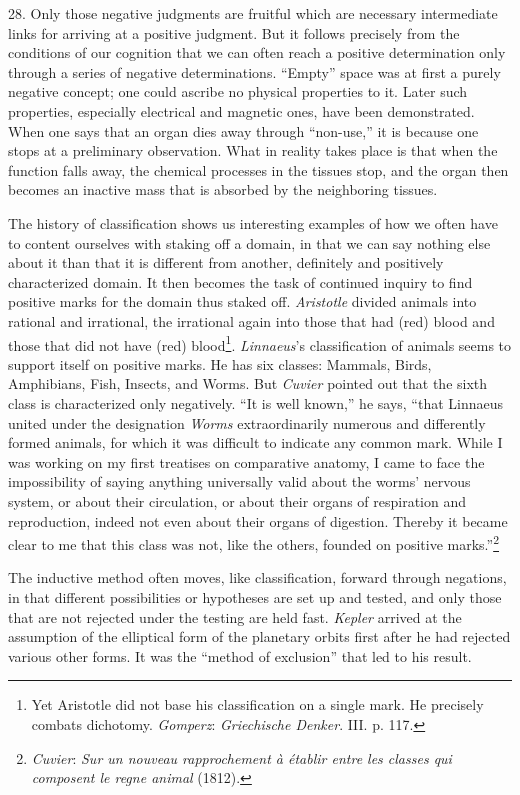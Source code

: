 \documentclass[12pt,a4paper]{book}
\newcommand{\opage}[1]{\marginnote{\footnotesize\textit{[#1]}}}
\begin{document}
28. Only those negative judgments are fruitful which are necessary
intermediate links for arriving at a positive judgment. But it follows
precisely from the conditions of our cognition that we can often reach a
positive determination only through a series of negative determinations.
``Empty'' space was at first a purely negative concept; one could ascribe
no physical properties to it. Later such properties, especially electrical
and magnetic ones, have been demonstrated. When one says that an organ
dies away through ``non-use,'' it is because one stops at a preliminary
observation. What in reality takes place is that when the function falls
away, the chemical processes in the tissues stop, and the organ then
becomes an inactive mass that is absorbed by the neighboring tissues.

The history of classification shows us interesting examples of how we
often have to content ourselves with staking off a domain, in that we can
say nothing else about it than that it is different from another,
definitely and positively characterized \opage{81}domain. It then becomes the task
of continued inquiry to find positive marks for the domain thus staked
off. \emph{Aristotle} divided animals into rational and irrational, the
irrational again into those that had (red) blood and those that did not
have (red) blood\footnote{Yet Aristotle did not base his classification on
a single mark. He precisely combats dichotomy. \emph{Gomperz}:
\emph{Griechische Denker}. III. p. 117.}. \emph{Linnaeus}'s classification
of animals seems to support itself on positive marks. He has six classes:
Mammals, Birds, Amphibians, Fish, Insects, and Worms. But \emph{Cuvier}
pointed out that the sixth class is characterized only negatively. ``It is
well known,'' he says, ``that Linnaeus united under the designation
\emph{Worms} extraordinarily numerous and differently formed animals, for
which it was difficult to indicate any common mark. While I was working on
my first treatises on comparative anatomy, I came to face the
impossibility of saying anything universally valid about the worms'
nervous system, or about their circulation, or about their organs of
respiration and reproduction, indeed not even about their organs of
digestion. Thereby it became clear to me that this class was not, like the
others, founded on positive marks.''\footnote{\emph{Cuvier}: \emph{Sur un
nouveau rapprochement à établir entre les classes qui composent le regne
animal} (1812).}

The inductive method often moves, like classification, forward through
negations, in that different possibilities or hypotheses are set up and
tested, and only those that are not rejected under the testing are held
fast. \emph{Kepler} arrived at the assumption of the elliptical form of
the planetary orbits first after he had rejected various other forms. It
was the ``method of exclusion'' that led to his result.
\end{document}
